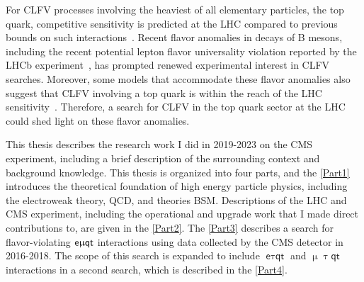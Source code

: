 For \ac{CLFV} processes involving the heaviest of all elementary particles, the top quark, competitive sensitivity is predicted at the \ac{LHC} compared to previous bounds on such interactions~\cite{Davidson:2015zza}. Recent flavor anomalies in decays of B mesons, including the recent potential lepton flavor universality violation reported by the \ac{LHCb} experiment~\cite{LHCb:2023zxo}, has prompted renewed experimental interest in \ac{CLFV} searches. Moreover, some models that accommodate these flavor anomalies also suggest that \ac{CLFV} involving a top quark is within the reach of the \ac{LHC} sensitivity~\cite{Kim:2018oih}. Therefore, a search for \ac{CLFV} in the top quark sector at the \ac{LHC} could shed light on these flavor anomalies.

This thesis describes the research work I did in 2019-2023 on the \ac{CMS} experiment, including a brief description of the surrounding context and background knowledge. This thesis is organized into four parts, and the \autoref{Part1} introduces the theoretical foundation of high energy particle physics, including the electroweak theory, \ac{QCD}, and theories \ac{BSM}. Descriptions of the \ac{LHC} and {CMS} experiment, including the operational and upgrade work that I made direct contributions to, are given in the \autoref{Part2}. The \autoref{Part3} describes a search for flavor-violating $\textsf{e}\upmu\textsf{{q}t}$ interactions using data collected by the \ac{CMS} detector in 2016-2018. The scope of this search is expanded to include $\textsf{e}\uptau\textsf{qt}$ and $\upmu\uptau\textsf{qt}$ interactions in a second search, which is described in the \autoref{Part4}.




